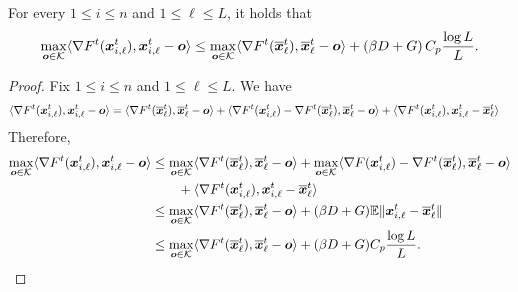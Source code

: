 \setcounter{lemma}{1}

\begin{lemma}
For every $1 \leq i \leq n$ and $1 \leq \ell \leq L$, it holds that
\begin{align*}
    \max_{\bm{o} \in \mathcal{K}}\langle \nabla F^{t} (\bm{x}^t_{i,\ell}), \bm{x}^t_{i,\ell} - \bm{o} \rangle 
     \leq \max_{\bm{o} \in \mathcal{K}}\langle \nabla F^{t} (\overline{\bm{x}}^t_{\ell}), \overline{\bm{x}}^t_{\ell} - \bm{o} \rangle
    + \left(\beta D + G \right)C_p \frac{\log L}{L}.
\end{align*}
\end{lemma}
%
\begin{proof} 
Fix $1 \leq i \leq n$ and $1 \leq \ell \leq L$. We have
    \begin{align*}
        \langle \nabla F^{t} (\bm{x}^t_{i,\ell}), \bm{x}^t_{i,\ell} - \bm{o} \rangle 
        & = \langle \nabla F^{t} (\overline{\bm{x}}^t_{\ell}), \overline{\bm{x}}^t_{\ell} - \bm{o} \rangle + \langle \nabla F^{t} (\bm{x}^t_{i,\ell}) - \nabla F^{t} (\overline{\bm{x}}^t_\ell), \overline{\bm{x}}^t_\ell - \bm{o} \rangle + \langle \nabla F^{t} (\bm{x}^t_{i,\ell}), \bm{x}^t_{i,\ell} - \overline{\bm{x}}^t_\ell \rangle
    \end{align*}
Therefore,
    \begin{align*}
        \max_{\bm{o} \in \mathcal{K}}\langle \nabla F^{t} (\bm{x}^t_{i,\ell}), \bm{x}^t_{i,\ell} - \bm{o} \rangle 
        & \leq \max_{\bm{o} \in \mathcal{K}}\langle \nabla F^{t} (\overline{\bm{x}}^t_\ell), \overline{\bm{x}}^t_\ell - \bm{o} \rangle + \max_{\bm{o} \in \mathcal{K}} \langle \nabla F (\bm{x}^t_{i,\ell}) - \nabla F^{t} (\overline{\bm{x}}^t_\ell), \overline{\bm{x}}^t_\ell - \bm{o} \rangle \\
        	& \qquad + \langle \nabla F^{t} (\bm{x}^t_{i,\ell}), \bm{x}^t_{i,\ell} - \overline{\bm{x}}^t_\ell \rangle \\
        & \leq \max_{\bm{o} \in \mathcal{K}}\langle \nabla F^{t} (\overline{\bm{x}}^t_\ell), \overline{\bm{x}}^t_\ell - \bm{o} \rangle  + (\beta D + G) \mathbb{E}{\|\bm{x}^t_{i,\ell} - \overline{\bm{x}}^t_\ell\|} \\
        & \leq \max_{\bm{o} \in \mathcal{K}}\langle \nabla F^{t} (\overline{\bm{x}}^t_\ell), \overline{\bm{x}}^t_\ell - \bm{o} \rangle + (\beta D + G)C_p \frac{\log L}{L}.
    \end{align*}
\end{proof}

